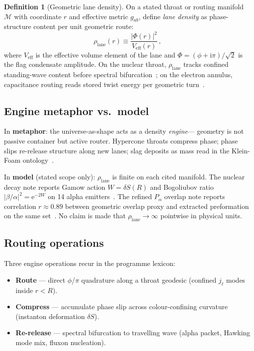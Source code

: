 \documentclass[11pt,a4paper]{article}
\theoremstyle{remark}
\theoremstyle{definition}
\newtheorem{definition}{Definition}[section]
\newcommand{\ii}{\mathrm{i}}
\newcommand{\ee}{\mathrm{e}}
\begin{document}
\begin{definition}[Geometric lane density]
On a stated throat or routing manifold $\mathcal{M}$ with coordinate $r$ and
effective metric $g_{ab}$, define \emph{lane density} as phase-structure
content per unit geometric route:
\begin{equation}
\rho_{\mathrm{lane}}(r) \equiv
\frac{|\Phi(r)|^2}{V_{\mathrm{eff}}(r)}\,,
\end{equation}
where $V_{\mathrm{eff}}$ is the effective volume element of the lane and
$\Phi=(\phi+\ii\pi)/\sqrt{2}$ is the flag condensate amplitude.  On the
nuclear throat, $\rho_{\mathrm{lane}}$ tracks confined standing-wave content
before spectral bifurcation~\cite{FlagDecay2026}; on the electron annulus,
capacitance routing reads stored twist energy per geometric turn~\cite{Mobius2026}.
\end{definition}

\subsection{Engine metaphor vs.\ model}

In \textbf{metaphor}: the universe-as-shape acts as a density \emph{engine}---
geometry is not passive container but active router.  Hypercone throats compress
phase; phase slips re-release structure along new lanes; slag deposits as mass
read in the Klein-Foam ontology~\cite{KFM2026}.

In \textbf{model} (stated scope only): $\rho_{\mathrm{lane}}$ is finite on
each cited manifold.  The nuclear decay note reports Gamow action
$W=\delta S(R)$ and Bogoliubov ratio $|\beta/\alpha|^2=\ee^{-2W}$ on 14
alpha emitters~\cite{FlagDecay2026}.  The refined $P_\alpha$ overlap note
reports correlation $r\approx 0.89$ between geometric overlap proxy and
extracted preformation on the same set~\cite{PalphaRefined2026}.  No claim is
made that $\rho_{\mathrm{lane}}\to\infty$ pointwise in physical units.

\subsection{Routing operations}

Three engine operations recur in the programme lexicon:

\begin{itemize}[leftmargin=1.3em,itemsep=2pt]
  \item \textbf{Route} --- direct $\phi$/$\pi$ quadrature along a throat
        geodesic (confined $j_\ell$ modes inside $r<R$).
  \item \textbf{Compress} --- accumulate phase slip across colour-confining
        curvature (instanton deformation $\delta S$).
  \item \textbf{Re-release} --- spectral bifurcation to travelling wave
        (alpha packet, Hawking mode mix, fluxon nucleation).
\end{itemize}
\end{document}
